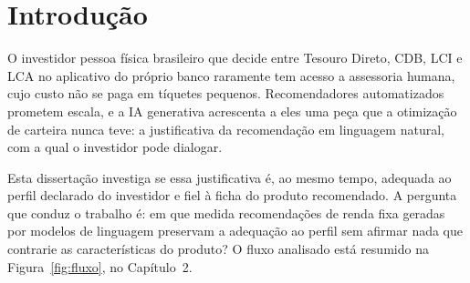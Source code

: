
\section{Introdução}

O investidor pessoa física brasileiro que decide entre Tesouro Direto, CDB, LCI
e LCA no aplicativo do próprio banco raramente tem acesso a assessoria humana,
cujo custo não se paga em tíquetes pequenos. Recomendadores automatizados
prometem escala, e a IA generativa acrescenta a eles uma peça que a otimização
de carteira nunca teve: a justificativa da recomendação em linguagem natural,
com a qual o investidor pode dialogar.

Esta dissertação investiga se essa justificativa é, ao mesmo tempo, adequada ao
perfil declarado do investidor e fiel à ficha do produto recomendado. A
pergunta que conduz o trabalho é: em que medida recomendações de renda fixa
geradas por modelos de linguagem preservam a adequação ao perfil sem afirmar
nada que contrarie as características do produto? O fluxo analisado está
resumido na Figura~\ref{fig:fluxo}, no Capítulo~2.
